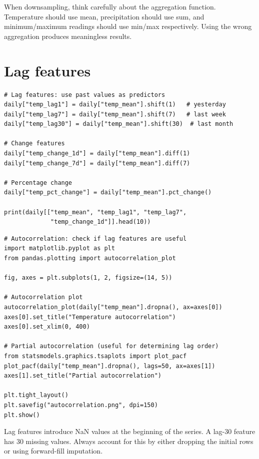 \begin{preprocesstip}
When downsampling, think carefully about the aggregation function. Temperature should use mean, precipitation should use sum, and minimum/maximum readings should use min/max respectively. Using the wrong aggregation produces meaningless results.
\end{preprocesstip}

\section{Lag features}

\begin{verbatim}
# Lag features: use past values as predictors
daily["temp_lag1"] = daily["temp_mean"].shift(1)   # yesterday
daily["temp_lag7"] = daily["temp_mean"].shift(7)   # last week
daily["temp_lag30"] = daily["temp_mean"].shift(30)  # last month

# Change features
daily["temp_change_1d"] = daily["temp_mean"].diff(1)
daily["temp_change_7d"] = daily["temp_mean"].diff(7)

# Percentage change
daily["temp_pct_change"] = daily["temp_mean"].pct_change()

print(daily[["temp_mean", "temp_lag1", "temp_lag7",
             "temp_change_1d"]].head(10))
\end{verbatim}

\begin{verbatim}
# Autocorrelation: check if lag features are useful
import matplotlib.pyplot as plt
from pandas.plotting import autocorrelation_plot

fig, axes = plt.subplots(1, 2, figsize=(14, 5))

# Autocorrelation plot
autocorrelation_plot(daily["temp_mean"].dropna(), ax=axes[0])
axes[0].set_title("Temperature autocorrelation")
axes[0].set_xlim(0, 400)

# Partial autocorrelation (useful for determining lag order)
from statsmodels.graphics.tsaplots import plot_pacf
plot_pacf(daily["temp_mean"].dropna(), lags=50, ax=axes[1])
axes[1].set_title("Partial autocorrelation")

plt.tight_layout()
plt.savefig("autocorrelation.png", dpi=150)
plt.show()
\end{verbatim}

\begin{warningbox}
Lag features introduce NaN values at the beginning of the series. A lag-30 feature has 30 missing values. Always account for this by either dropping the initial rows or using forward-fill imputation.
\end{warningbox}

